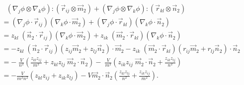 \documentclass{article}
\begin{document}
\begin{align*}
&\ \ \ (\nabla_j \phi \otimes \nabla_k \phi) : (\vec r_{ij} \otimes \vec m_2)
+ (\nabla_j \phi \otimes \nabla_k \phi) : (\vec r_{kl} \otimes \vec n_2) \\
&= (\nabla_j \phi \cdot \vec r_{ij})
  (\nabla_k \phi \cdot \vec m_2)
+ (\nabla_j \phi \cdot \vec r_{kl})
  (\nabla_k \phi \cdot \vec n_2) \\
&= z_{kl} \; (\vec n_2 \cdot \vec r_{ij})
  (\nabla_k \phi \cdot \vec m_2 ) 
+  z_{ik} \; (\vec m_2 \cdot \vec r_{kl})
  (\nabla_k \phi \cdot \vec n_2 ) \\
&= -z_{kl} \; (\vec n_2 \cdot \vec r_{ij})
   (z_{ij} \vec m_2 + z_{lj} \vec n_2) \cdot \vec m_2 
-  z_{ik} \; (\vec m_2 \cdot \vec r_{kl})
   (r_{ij} \vec m_2 + r_{lj} \vec n_2) \cdot \vec n_2 \\
&= - \; \frac{V}{n^2}
  \left( 
    \frac {z_{kl} z_{ij}}{m^2} +
    z_{kl} z_{lj} \; \vec m_2 \cdot \vec n_2 
  \right)
- \; \frac{V}{m^2}
  \left( 
    z_{ik} z_{ij} \; \vec m_2 \cdot \vec n_2 +
    \frac {z_{ik} z_{lj}} {n^2} 
  \right) \\  
&= - \frac{V}{m^2 n^2} 
  \left(
    z_{kl} z_{ij} + z_{ik} z_{lj}
  \right)
   - V \vec m_2 \cdot \vec n_2
   \left(
     \frac {z_{kl} z_{lj}} {n^2} 
    +\frac {z_{ik} z_{ij}} {m^2} 
   \right).
\end{align*}
%
\end{document}
